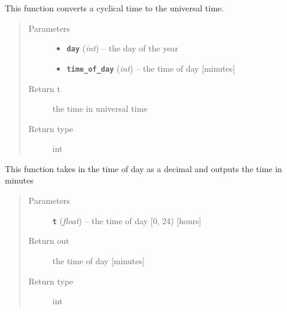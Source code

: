 \documentclass[letterpaper,10pt,english]{sphinxmanual}
\begin{document}
\begin{fulllineitems}
\label{temporal:temporal.convert_cylical_to_universal}
This function converts a cyclical time to the universal time.
\begin{quote}\begin{description}
\item[{Parameters}] \leavevmode\begin{itemize}
\item {} 
\textbf{\texttt{day}} (\emph{int}) -- the day of the year

\item {} 
\textbf{\texttt{time\_of\_day}} (\emph{int}) -- the time of day {[}minutes{]}

\end{itemize}

\item[{Return t}] \leavevmode
the time in universal time

\item[{Return type}] \leavevmode
int

\end{description}\end{quote}

\end{fulllineitems}


\begin{fulllineitems}
\label{temporal:temporal.convert_decimal_to_min}
This function takes in the time of day as a decimal and outputs the time in minutes
\begin{quote}\begin{description}
\item[{Parameters}] \leavevmode
\textbf{\texttt{t}} (\emph{float}) -- the time of day {[}0, 24) {[}hours{]}

\item[{Return out}] \leavevmode
the time of day {[}minutes{]}

\item[{Return type}] \leavevmode
int

\end{description}\end{quote}

\end{fulllineitems}
\end{document}
